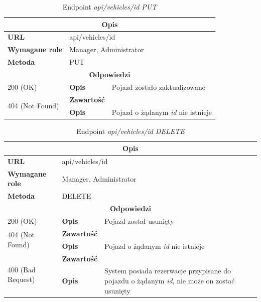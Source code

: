 \documentclass[eng,printmode,openany]{mgr}
\begin{document}
	\begin{table}[H]
		\caption{Endpoint \textit{api/vehicles/id PUT}}
		\begin{tabularx}{\textwidth}{|l|l|X|}
			\hline
			\multicolumn{3}{|c|}{\textbf{\textbf{Opis}}}
			\\ \hline
			\textbf{URL}                       & \multicolumn{2}{l|}{api/vehicles/id}
			\\ \hline
			\textbf{Wymagane role}             & \multicolumn{2}{l|}{Manager, Administrator}
			\\ \hline
			\textbf{Metoda}                    & \multicolumn{2}{l|}{PUT}
			\\ \hline
			\multicolumn{3}{|c|}{\textbf{Odpowiedzi}}
			\\ \hline
			200 (OK) 		                        & \textbf{Opis}      	& Pojazd zostało zaktualizowane
			\\ \hline
			\multirow{2}{*}{404 (Not Found)} 	    & \textbf{Zawartość}     & 
			\\ \cline{2-3}                          & \textbf{Opis}          & Pojazd o żądanym \textit{id} nie istnieje
			\\ \hline
		\end{tabularx}
	\end{table}
	
	\begin{table}[H]
		\caption{Endpoint \textit{api/vehicles/id DELETE}}
		\begin{tabularx}{\textwidth}{|l|l|X|}
			\hline
			\multicolumn{3}{|c|}{\textbf{\textbf{Opis}}}
			\\ \hline
			\textbf{URL}                       & \multicolumn{2}{l|}{api/vehicles/id}
			\\ \hline
			\textbf{Wymagane role}             & \multicolumn{2}{l|}{Manager, Administrator}
			\\ \hline
			\textbf{Metoda}                    & \multicolumn{2}{l|}{DELETE}
			\\ \hline
			\multicolumn{3}{|c|}{\textbf{Odpowiedzi}}
			\\ \hline
			200 (OK)			                & \textbf{Opis}         	& Pojazd został usunięty
			\\ \hline
			\multirow{2}{*}{404 (Not Found)} 	& \textbf{Zawartość}     & 
			\\ \cline{2-3}                      & \textbf{Opis}          & Pojazd o żądanym \textit{id} nie istnieje
			\\ \hline
			\multirow{2}{*}{400 (Bad Request)} 	& \textbf{Zawartość}     & 
			\\ \cline{2-3}                      & \textbf{Opis}          & System posiada rezerwacje przypisane do pojazdu o żądanym \textit{id}, nie może on zostać usunięty
			\\ \hline
		\end{tabularx}
	\end{table}
	
\end{document}
